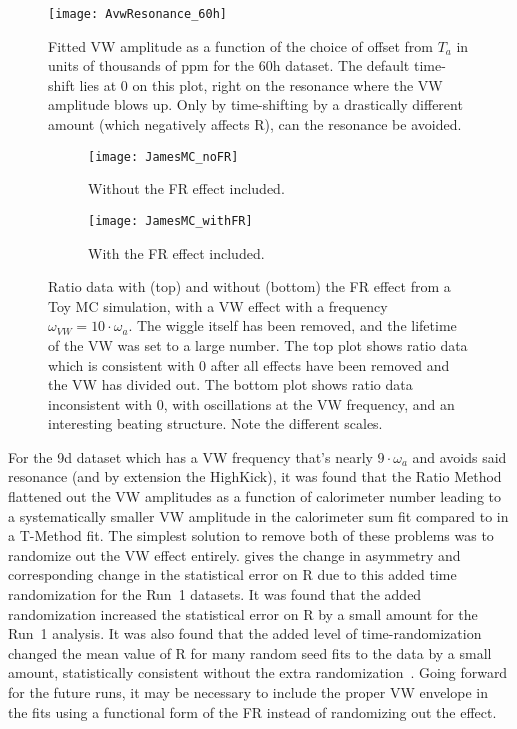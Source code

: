 \begin{figure}
    \centering
    \texttt{[image: AvwResonance\_60h]}
    \caption[VW amplitude resonance in the 60h dataset]{Fitted VW amplitude as a function of the choice of  offset from $T_{a}$ in units of thousands of ppm for the 60h dataset. The default time-shift lies at 0 on this plot, right on the resonance where the VW amplitude blows up. Only by time-shifting by a drastically different amount (which negatively affects R), can the resonance be avoided.}
    \label{fig:VWresonance}
\end{figure}


\begin{figure}
\centering
    \begin{subfigure}[t]{0.6\textwidth}
        \centering
        \texttt{[image: JamesMC\_noFR]}
        \caption{Without the FR effect included.}
    \end{subfigure}%

    \begin{subfigure}[t]{0.6\textwidth}
        \centering
        \texttt{[image: JamesMC\_withFR]}
        \caption{With the FR effect included.}
    \end{subfigure}
\caption[VW envelope in Ratio Method Toy MC data with and without FR effect]{Ratio data with (top) and without (bottom) the FR effect from a Toy MC simulation, with a VW effect with a frequency $\omega_{VW} = 10 \cdot \omega_{a}$. The \wa wiggle itself has been removed, and the lifetime of the VW was set to a large number. The top plot shows ratio data which is consistent with 0 after all effects have been removed and the VW has divided out. The bottom plot shows ratio data inconsistent with 0, with oscillations at the VW frequency, and an interesting beating structure. Note the different scales.}
\label{fig:JamesMC_VW_FR}
\end{figure}


For the 9d dataset which has a VW frequency that's nearly $9 \cdot \omega_{a}$ and avoids said resonance (and by extension the HighKick), it was found that the Ratio Method flattened out the VW amplitudes as a function of calorimeter number leading to a systematically smaller VW amplitude in the calorimeter sum fit compared to in a T-Method fit. The simplest solution to remove both of these problems was to randomize out the VW effect entirely.  gives the change in asymmetry and corresponding change in the statistical error on R due to this added time randomization for the Run~1 datasets. It was found that the added randomization increased the statistical error on R by a small amount for the Run~1 analysis. It was also found that the added level of time-randomization changed the mean value of R for many random seed fits to the data by a small amount, statistically consistent without the extra randomization~\cite{VWinRatio}. Going forward for the future runs, it may be necessary to include the proper VW envelope in the fits using a functional form of the FR instead of randomizing out the effect.

